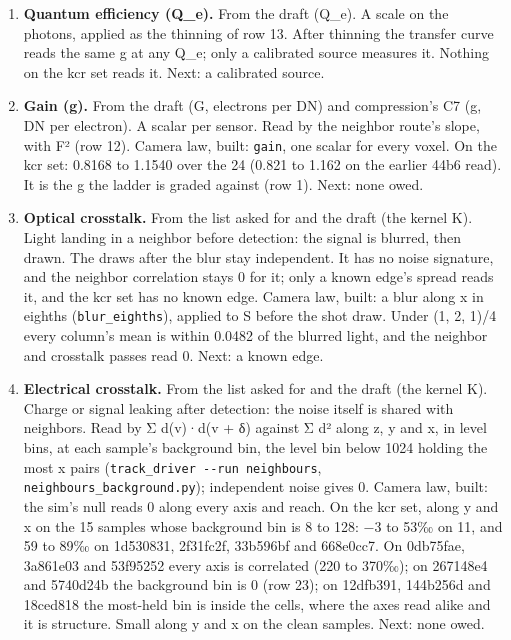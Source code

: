 \begin{enumerate}
\begin{itemize}
\item Prior art, cited from knowledge. The Fano factor of a thinned count, f′ − 1 = q(f − 1), from the photocount statistics of sub-Poisson light: L. Mandel, “Sub-Poissonian photon statistics in resonance fluorescence”, Opt. Lett. 4(7), 1979, 205–207.
\end{itemize}
\item \textbf{Quantum efficiency (Q\_\allowbreak{}e).} From the draft (Q\_\allowbreak{}e). A scale on the photons, applied as the thinning of row 13. After thinning the transfer curve reads the same g at any Q\_\allowbreak{}e; only a calibrated source measures it. Nothing on the kcr set reads it. Next: a calibrated source.
\item \textbf{Gain (g).} From the draft (G, electrons per DN) and compression's C7 (g, DN per electron). A scalar per sensor. Read by the neighbor route's slope, with F² (row 12). Camera law, built: \texttt{gain}, one scalar for every voxel. On the kcr set: 0.8168 to 1.1540 over the 24 (0.821 to 1.162 on the earlier 44b6 read). It is the g the ladder is graded against (row 1). Next: none owed.
\item \textbf{Optical crosstalk.} From the list asked for and the draft (the kernel K). Light landing in a neighbor before detection: the signal is blurred, then drawn. The draws after the blur stay independent. It has no noise signature, and the neighbor correlation stays 0 for it; only a known edge's spread reads it, and the kcr set has no known edge. Camera law, built: a blur along x in eighths (\texttt{blur\_\allowbreak{}eighths}), applied to S before the shot draw. Under (1, 2, 1)/4 every column's mean is within 0.0482 of the blurred light, and the neighbor and crosstalk passes read 0. Next: a known edge.
\item \textbf{Electrical crosstalk.} From the list asked for and the draft (the kernel K). Charge or signal leaking after detection: the noise itself is shared with neighbors. Read by Σ d(v)·d(v + δ) against Σ d² along z, y and x, in level bins, at each sample's background bin, the level bin below 1024 holding the most x pairs (\texttt{track\_\allowbreak{}driver -\allowbreak{}-\allowbreak{}run neighbours}, \texttt{neighbours\_\allowbreak{}background.\allowbreak{}py}); independent noise gives 0. Camera law, built: the sim's null reads 0 along every axis and reach. On the kcr set, along y and x on the 15 samples whose background bin is 8 to 128: −3 to 53‰ on 11, and 59 to 89‰ on 1d530831, 2f31fc2f, 33b596bf and 668e0cc7. On 0db75fae, 3a861e03 and 53f95252 every axis is correlated (220 to 370‰); on 267148e4 and 5740d24b the background bin is 0 (row 23); on 12dfb391, 144b256d and 18ced818 the most-held bin is inside the cells, where the axes read alike and it is structure. Small along y and x on the clean samples. Next: none owed.

\end{enumerate}
